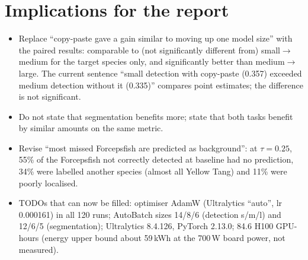 \documentclass[11pt,a4paper]{article}
\begin{document}
\section{Implications for the report}
\begin{itemize}
\item Replace ``copy-paste gave a gain similar to moving up one model size'' with the paired results: comparable to (not
significantly different from) small$\rightarrow$medium for the target species only, and significantly better than medium$\rightarrow$large.
The current sentence ``small detection with copy-paste (0.357) exceeded medium detection without it (0.335)'' compares point
estimates; the difference is not significant.
\item Do not state that segmentation benefits more; state that both tasks benefit by similar amounts on the same metric.
\item Revise ``most missed Forcepsfish are predicted as background'': at $\tau=0.25$, 55\% of the Forcepsfish not correctly detected at
baseline had no prediction, 34\% were labelled another species (almost all Yellow Tang) and 11\% were poorly localised.
\item TODOs that can now be filled: optimiser AdamW (Ultralytics ``auto'', lr 0.000161) in all 120 runs; AutoBatch sizes 14/8/6
(detection s/m/l) and 12/6/5 (segmentation); Ultralytics 8.4.126, PyTorch 2.13.0; 84.6 H100 GPU-hours (energy upper bound about
59\,kWh at the 700\,W board power, not measured).
\end{itemize}
\end{document}
